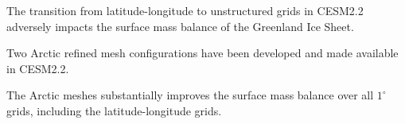 \documentclass[draft]{agujournal2019}
\begin{document}





\begin{keypoints}
\item The transition from latitude-longitude to unstructured grids in CESM2.2 adversely impacts the surface mass balance of the Greenland Ice Sheet.
\item Two Arctic refined mesh configurations have been developed and made available in CESM2.2.
\item The Arctic meshes substantially improves the surface mass balance over all $1^{\circ}$ grids, including the latitude-longitude grids.
\end{keypoints}

%
%

%
%
\end{document}
